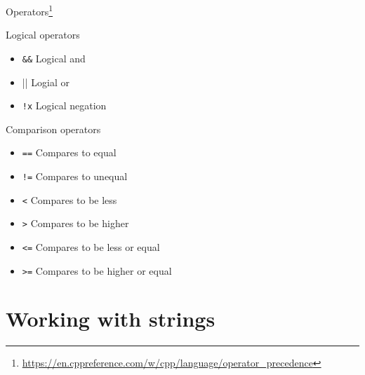 \documentclass[\classoption]{beamer}
\begin{document}
\begin{frame}{Operators\footnote{\tiny\url{https://en.cppreference.com/w/cpp/language/operator_precedence}}}
\begin{block}{Logical operators}
\begin{itemize}
\item \lstinline|&&| Logical and
\item \lstinline|||| Logial or
\item \lstinline|!x| Logical negation 
\end{itemize}
\end{block}
\begin{block}{Comparison operators}
\begin{itemize}
\item \lstinline|==|  Compares to equal
\item \lstinline|!=| Compares to unequal
\item \lstinline|<| Compares to be less
\item \lstinline|>| Compares to be higher
\item \lstinline|<=| Compares to be less or equal
\item \lstinline|>=| Compares to be higher or equal
\end{itemize}
\end{block}
\end{frame}

\section{Working with strings}
\end{document}
